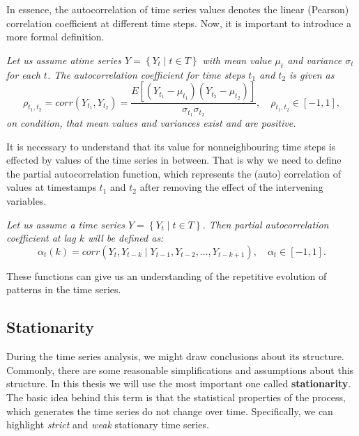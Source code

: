 In essence, the autocorrelation of time series values denotes the linear (Pearson) correlation coefficient at different time steps. Now, it is important to introduce a more formal definition.

\begin{definition}
\textit{Let us assume atime series $Y = \left\{Y_{t}\;|\; t \in T\right\}$ with mean value $\mu_{t}$ and variance $\sigma_{t}$ for each $t$. The autocorrelation coefficient for time steps $t_1$ and $t_{2}$ is given as}
\begin{equation}
\rho_{t_1, t_2} = corr(Y_{t_1}, Y_{t_2}) = \frac{E[(Y_{t_1} - \mu_{t_1})(Y_{t_2} - \mu_{t_2})]}{\sigma_{t_1}\sigma_{t_2}}, \quad \rho_{t_1, t_2} \in [-1, 1],
\label{eq_autocorrelation_func}
\end{equation}
\textit{on condition, that mean values and variances exist and are positive.}
\end{definition}

It is necessary to understand that its value for nonneighbouring time steps is effected by values of the time series in between. That is why we need to define the partial autocorrelation function, which represents the (auto) correlation of values at timestamps $t_1$ and $t_2$ after removing the effect of the intervening variables.

\begin{definition}
\textit{Let us assume a time series $Y = \left\{Y_{t}\;|\; t \in T\right\}$. Then partial autocorrelation coefficient at lag $k$ will be defined as:}
\begin{equation}
\alpha_{t}(k) = corr(Y_{t}, Y_{t-k}\;|\; Y_{t-1}, Y_{t-2}, \ldots, Y_{t-k+1}), \quad \alpha_{t} \in [-1, 1].
\label{eq_partial_autocorrelation_func}
\end{equation}
\end{definition}
These functions can give us an understanding of the repetitive evolution of patterns in the time series. 

\subsection{Stationarity}

During the time series analysis, we might draw conclusions about its structure. Commonly, there are some reasonable simplifications and assumptions about this structure. In this thesis we will use the most important one called \textbf{stationarity}. The basic idea behind this term is that the statistical properties of the process, which generates the time series do not change over time. Specifically, we can highlight \textit{strict} and \textit{weak} stationary time series. 

